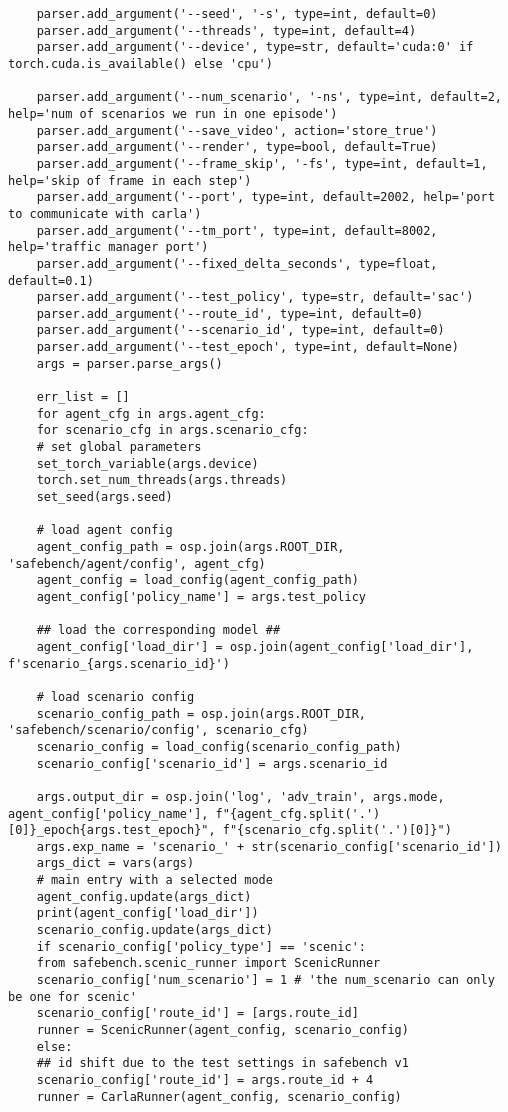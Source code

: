 \begin{lstlisting}
	parser.add_argument('--seed', '-s', type=int, default=0)
	parser.add_argument('--threads', type=int, default=4)
	parser.add_argument('--device', type=str, default='cuda:0' if torch.cuda.is_available() else 'cpu')   
	
	parser.add_argument('--num_scenario', '-ns', type=int, default=2, help='num of scenarios we run in one episode')
	parser.add_argument('--save_video', action='store_true')
	parser.add_argument('--render', type=bool, default=True)
	parser.add_argument('--frame_skip', '-fs', type=int, default=1, help='skip of frame in each step')
	parser.add_argument('--port', type=int, default=2002, help='port to communicate with carla')
	parser.add_argument('--tm_port', type=int, default=8002, help='traffic manager port')
	parser.add_argument('--fixed_delta_seconds', type=float, default=0.1)
	parser.add_argument('--test_policy', type=str, default='sac')
	parser.add_argument('--route_id', type=int, default=0)
	parser.add_argument('--scenario_id', type=int, default=0)
	parser.add_argument('--test_epoch', type=int, default=None)
	args = parser.parse_args()
	
	err_list = []
	for agent_cfg in args.agent_cfg:
	for scenario_cfg in args.scenario_cfg:
	# set global parameters
	set_torch_variable(args.device)
	torch.set_num_threads(args.threads)
	set_seed(args.seed)
	
	# load agent config
	agent_config_path = osp.join(args.ROOT_DIR, 'safebench/agent/config', agent_cfg)
	agent_config = load_config(agent_config_path)
	agent_config['policy_name'] = args.test_policy
	
	## load the corresponding model ##
	agent_config['load_dir'] = osp.join(agent_config['load_dir'], f'scenario_{args.scenario_id}')
	
	# load scenario config
	scenario_config_path = osp.join(args.ROOT_DIR, 'safebench/scenario/config', scenario_cfg)
	scenario_config = load_config(scenario_config_path)
	scenario_config['scenario_id'] = args.scenario_id
	
	args.output_dir = osp.join('log', 'adv_train', args.mode, agent_config['policy_name'], f"{agent_cfg.split('.')[0]}_epoch{args.test_epoch}", f"{scenario_cfg.split('.')[0]}")
	args.exp_name = 'scenario_' + str(scenario_config['scenario_id'])
	args_dict = vars(args)
	# main entry with a selected mode
	agent_config.update(args_dict)
	print(agent_config['load_dir'])
	scenario_config.update(args_dict)
	if scenario_config['policy_type'] == 'scenic':
	from safebench.scenic_runner import ScenicRunner
	scenario_config['num_scenario'] = 1 # 'the num_scenario can only be one for scenic'
	scenario_config['route_id'] = [args.route_id]
	runner = ScenicRunner(agent_config, scenario_config)
	else:
	## id shift due to the test settings in safebench v1
	scenario_config['route_id'] = args.route_id + 4
	runner = CarlaRunner(agent_config, scenario_config)
	

\end{lstlisting}
